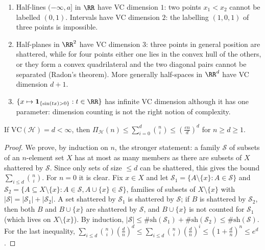 \begin{example}\label{statistics:example-vc}
\begin{enumerate}
\item Half-lines $(-\infty, a]$ in $\RR$ have VC dimension $1$: two points $x_1 < x_2$ cannot be labelled $(0, 1)$. Intervals have VC dimension $2$: the labelling $(1, 0, 1)$ of three points is impossible.
\item Half-planes in $\RR^2$ have VC dimension $3$: three points in general position are shattered, while for four points either one lies in the convex hull of the others, or they form a convex quadrilateral and the two
diagonal pairs cannot be separated (Radon's theorem). More generally half-spaces in $\RR^d$ have VC dimension $d + 1$.
\item $\{x \mapsto \mathbf{1}_{\{\sin(tx) > 0\}} : t \in \RR\}$ has infinite VC dimension although it has one parameter: dimension counting is not the right notion of complexity.
\end{enumerate}
\end{example}

\begin{lemma}\label{statistics:lemma-sauer-shelah}
If $\mathrm{VC}(\mathcal{H}) = d < \infty$, then $\Pi_{\mathcal{H}}(n) \leq \sum_{i=0}^d\binom ni \leq (\frac{en}{d})^d$ for $n \geq d \geq 1$.
\end{lemma}

\begin{proof}
We prove, by induction on $n$, the stronger statement: a family $\mathcal{S}$ of subsets of an $n$-element set $X$ has at most as many members as there are subsets of $X$ shattered by $\mathcal{S}$. Since only sets of size $\leq d$ can be
shattered, this gives the bound $\sum_{i \leq d}\binom ni$. For $n = 0$ it is clear. Fix $x \in X$ and let $\mathcal{S}_1 = \{A \setminus \{x\} : A \in \mathcal{S}\}$ and $\mathcal{S}_2 = \{A \subseteq X \setminus \{x\} : A \in \mathcal{S}, A \cup \{x\} \in \mathcal{S}\}$, families of subsets
of $X \setminus \{x\}$ with $|\mathcal{S}| = |\mathcal{S}_1| + |\mathcal{S}_2|$. A set shattered by $\mathcal{S}_1$ is shattered by $\mathcal{S}$; if $B$ is shattered by $\mathcal{S}_2$, then both $B$ and $B \cup \{x\}$ are shattered by $\mathcal{S}$, and $B \cup \{x\}$ is
not counted for $\mathcal{S}_1$ (which lives on $X \setminus \{x\}$). By induction, $|\mathcal{S}| \leq \#\mathrm{sh}(\mathcal{S}_1) + \#\mathrm{sh}(\mathcal{S}_2) \leq \#\mathrm{sh}(\mathcal{S})$. For the last inequality,
$\sum_{i \leq d}\binom ni(\frac dn)^d \leq \sum_{i \leq d}\binom ni(\frac dn)^i \leq (1 + \frac dn)^n \leq e^d$.
\end{proof}

